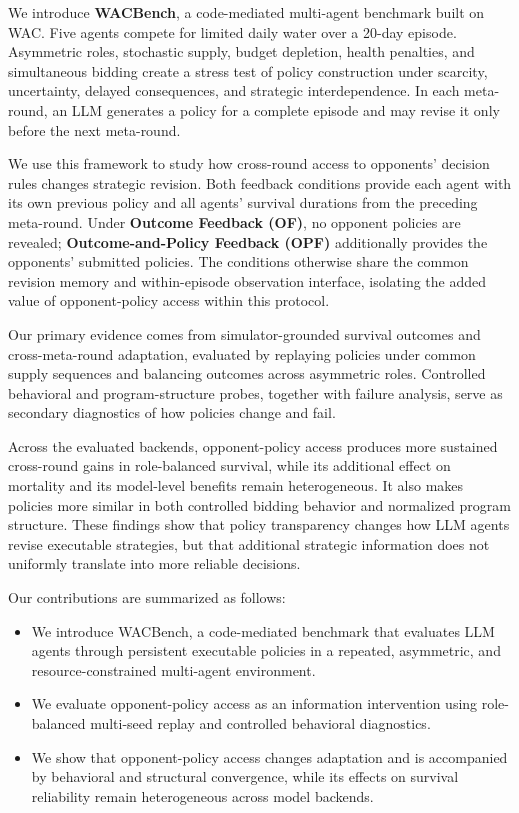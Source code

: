 \documentclass[letterpaper]{article} %
\begin{document}
We introduce \textbf{WACBench}, a code-mediated multi-agent benchmark built
on WAC. Five agents compete for limited daily water over a 20-day episode.
Asymmetric roles, stochastic supply, budget depletion, health penalties, and
simultaneous bidding create a stress test of policy construction under
scarcity, uncertainty, delayed consequences, and strategic interdependence.
In each meta-round, an LLM generates a policy for a complete episode and may
revise it only before the next meta-round.

We use this framework to study how cross-round access to opponents' decision
rules changes strategic revision. Both feedback conditions provide each agent
with its own previous policy and all agents' survival durations from the
preceding meta-round. Under \textbf{Outcome Feedback (OF)}, no opponent
policies are revealed; \textbf{Outcome-and-Policy Feedback (OPF)}
additionally provides the opponents' submitted policies. The conditions
otherwise share the common revision memory and within-episode observation
interface, isolating the added value of opponent-policy access within this
protocol.

Our primary evidence comes from simulator-grounded survival outcomes and
cross-meta-round adaptation, evaluated by replaying policies under common
supply sequences and balancing outcomes across asymmetric roles. Controlled
behavioral and program-structure probes, together with failure analysis, serve
as secondary diagnostics of how policies change and fail.

Across the evaluated backends, opponent-policy access produces more sustained
cross-round gains in role-balanced survival, while its additional effect on
mortality and its model-level benefits remain heterogeneous. It also makes
policies more similar in both controlled bidding behavior and normalized
program structure. These findings show that policy transparency changes how
LLM agents revise executable strategies, but that additional strategic
information does not uniformly translate into more reliable decisions.

Our contributions are summarized as follows:

\begin{itemize}
    \item We introduce WACBench, a code-mediated benchmark that evaluates
    LLM agents through persistent executable policies in a repeated,
    asymmetric, and resource-constrained multi-agent environment.
    
    \item We evaluate opponent-policy access as an information intervention
    using role-balanced multi-seed replay and controlled behavioral
    diagnostics.
    
    \item We show that opponent-policy access changes adaptation and is
    accompanied by behavioral and structural convergence, while its effects
    on survival reliability remain heterogeneous across model backends.
\end{itemize}
\end{document}
